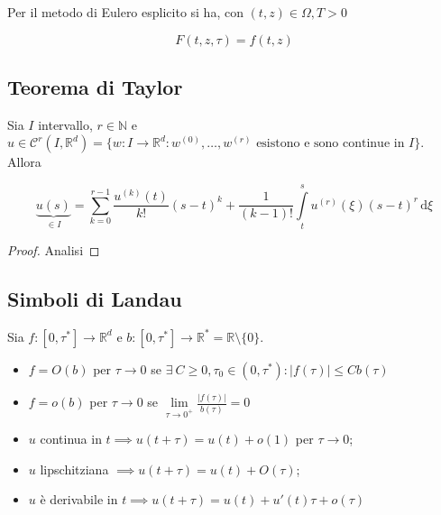 \documentclass[hidelinks, 10pt]{report}
\begin{document}
\begin{es}
Per il metodo di Eulero esplicito si ha, con $ (t, z) \in \Omega, T > 0 $

\[ F(t, z, \tau) = f(t, z) \]
\end{es}

\subsection{Teorema di Taylor}

Sia $ I $ intervallo, $ r \in \mathbb{N} $ e $ u \in \mathcal{C}^{r} (I, \mathbb{R}^{d}) = \{ w : I \to \mathbb{R}^{d} : w^{(0)}, \dotsc, w^{(r)} \text{ esistono e sono continue in } I \} $. Allora

\[ \underbrace{u(s)}_{\in I} = \sum\limits_{k = 0}^{r - 1} \frac{u^{(k)}(t)}{k!} (s - t)^{k} + \frac{1}{(k - 1)!} \int\limits_{t}^{s} u^{(r)} (\xi) (s - t)^{r} \, \mathrm{d}\xi \]

\begin{proof}
Analisi
\end{proof}

\subsection{Simboli di Landau}

Sia $ f: [0, \tau^{\ast}] \to \mathbb{R}^{d} $ e $ b: [0, \tau^{\ast}] \to \mathbb{R}^{\ast} = \mathbb{R} \setminus \{ 0 \} $.

\begin{itemize}
\item $ f = O (b) $ per $ \tau \to 0 $ se $ \exists\ C \ge 0, \tau_{0} \in (0, \tau^{\ast}) : \vert f(\tau) \vert \le C b(\tau) $
\item $ f = o(b) $ per $ \tau \to 0 $ se $ \lim\limits_{\tau \to 0^{+}} \frac{\vert f(\tau) \vert}{b(\tau)} = 0 $
\end{itemize}

\begin{es}
\noindent
\begin{itemize}
\item $ u $ continua in $ t \implies u(t + \tau) = u(t) + o(1) $ per $ \tau \to 0 $;
\item $ u $ lipschitziana $ \implies u(t + \tau) = u(t) + O(\tau) $;
\item $ u $ \`e derivabile in $ t \implies u(t + \tau) = u(t) + u'(t) \tau + o(\tau) $
\end{itemize}
\end{es}
\end{document}
